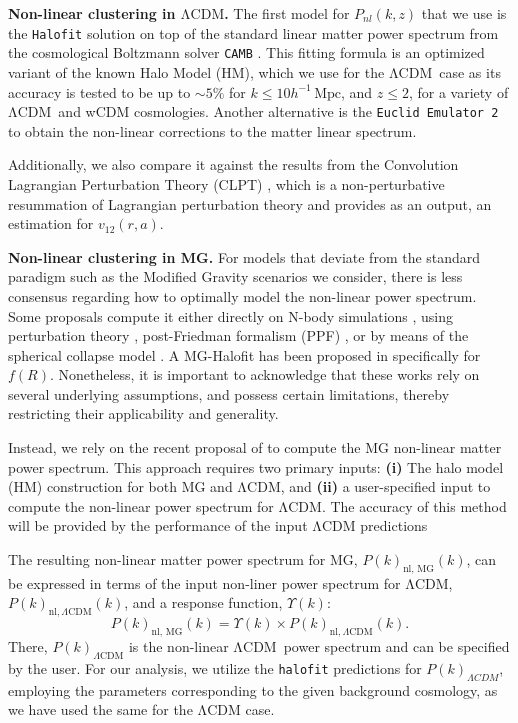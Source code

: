 \documentclass[%
 reprint,
groupedaddress,
nofootinbib,
nobibnotes,
 amsmath,amssymb,
 aps,
]{revtex4-2}
\newcommand{\code}[1]{{\texttt{#1}}}
\newcommand{\pairvel}{$v_{12}(r,a)$}
\newcommand{\lcdm}{$\mathrm{\Lambda CDM}$}
\newcommand{\Mpch}{$h^{-1}\,\mbox{Mpc}$}
\newcommand{\<}{\langle}
\renewcommand{\>}{\rangle}
\newcommand{\MJ}[1]{\textcolor{WildStrawberry}{[Mariana]: #1}}
\begin{document}
\textbf{Non-linear clustering in \lcdm{}.} The first model for $P_{nl}(k,z)$ that we use is the \code{Halofit} solution \cite{2019MNRAS.486.1448S, 2012ApJ...761..152T,2015MNRAS.454.1958M} on top of the standard linear matter power spectrum from the cosmological Boltzmann solver \code{CAMB} \cite{Lewis_2000,Howlett_2012}. 
%
This fitting formula is an optimized variant of the known Halo Model (HM), which we use for the \lcdm\-\ case as its accuracy is tested to be up to $\sim5\%$ for $k\leq10$\Mpch{}, and $z\leq2$, for a variety of \lcdm\-\ and wCDM cosmologies. Another alternative is the \code{Euclid Emulator 2 } \cite{2021MNRAS.505.2840E} to obtain the non-linear corrections to the matter linear spectrum. %

Additionally, we also compare it against the results from the Convolution Lagrangian Perturbation Theory (CLPT) \cite{2013MNRAS.429.1674C}, which is a    non-perturbative resummation of Lagrangian perturbation theory and provides as an output, an estimation for \pairvel{}.   



\textbf{Non-linear clustering in MG.}
%
For models that deviate from the standard paradigm such as the Modified Gravity scenarios we consider, there is less consensus regarding how to optimally model the non-linear power spectrum. Some proposals compute it  either directly on N-body simulations \citep{PhysRevD.78.123524, Alam_2021}, using perturbation theory \citep{PhysRevD.79.123512},  post-Friedman formalism (PPF)  \citep{PhysRevD.76.104043}, or by means of the spherical collapse model \citep{10.1093/mnras/stv2036}. A MG-Halofit has been proposed in \citep{Zhao_2014} specifically for $f(R)$. Nonetheless, it is important to acknowledge that these works rely on several underlying assumptions, and possess certain limitations, thereby restricting their applicability and generality.

Instead, we rely on the recent proposal of \cite{2023PhRvD.107h3525G} to compute the MG non-linear matter power spectrum.  This approach requires two primary inputs: {\textbf{(i)}} The halo model (HM) construction for both MG and \lcdm{}, and {\textbf{(ii)}} a user-specified input to compute the non-linear power spectrum for \lcdm{}. The accuracy of this method will be provided by the performance of the input \lcdm{} predictions


The resulting non-linear matter power spectrum for MG, $P(k)_{\text{nl, MG}}(k)$, can be expressed in terms of the input non-liner power spectrum for \lcdm{},  $P(k)_{\text{nl}, \Lambda \text{CDM}}(k)$, and a response function, $\Upsilon(k)$:
\begin{equation}
\label{eq:pkmg}
    P(k)_{\text{nl, MG}}(k) = \Upsilon(k) \times P(k)_{\text{nl}, \Lambda \text{CDM}}(k).
\end{equation}
%
There, $P(k)_{\Lambda \text{CDM}}$ is the non-linear \lcdm\ power spectrum and can be specified by the user. 
For our analysis, we utilize the \code{halofit} predictions for $P(k)_{\Lambda CDM}$, employing the parameters corresponding to the given background cosmology, as we have used the same for the \lcdm{} case.
\end{document}
